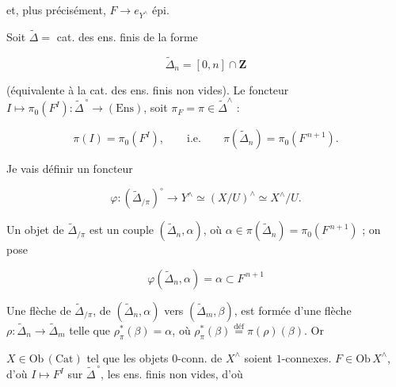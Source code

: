 \documentclass[11pt,a4paper]{article}
\begin{document}
et, plus précisément, $F \to e_{Y^{\wedge}}$ épi.


\struck{\ill{}} Soit $\widetilde{\Delta} = $ cat. des ens. finis de la forme

\[
  \widetilde{\Delta}_{n} = [0,n] \cap \mathbf{Z}
\]

(équivalente à la cat. des ens. finis non vides). Le foncteur
$I \mapsto \pi_{0}(F^{I}) : \widetilde{\Delta}^{\,\circ} \longrightarrow
(\mathrm{Ens})$, soit $\pi_{F} = \pi \in \widetilde{\Delta}^{\wedge}$ :

\[
  \pi(I) = \pi_{0}(F^{I}), \qquad \text{i.e.} \qquad
  \pi(\widetilde{\Delta}_{n}) = \pi_{0}(F^{\,n+1}).
\]

Je vais définir un foncteur

\[
  \varphi : (\widetilde{\Delta}_{/\pi})^{\circ} \longrightarrow Y^{\wedge}
  \simeq (X/U)^{\wedge} \simeq X^{\wedge}/U .
\]

Un objet de $\widetilde{\Delta}_{/\pi}$ est un couple
$(\widetilde{\Delta}_{n}, \alpha)$, où
$\alpha \in \pi(\widetilde{\Delta}_{n}) = \pi_{0}(F^{\,n+1})$ ; on pose

\[
  \varphi(\widetilde{\Delta}_{n}, \alpha) = \alpha \subset F^{\,n+1}
\]



Une flèche de $\widetilde{\Delta}_{/\pi}$, de
$(\widetilde{\Delta}_{n}, \alpha)$ vers $(\widetilde{\Delta}_{m}, \beta)$, est
formée d'une flèche $\rho : \widetilde{\Delta}_{n} \to \widetilde{\Delta}_{m}$
telle que $\rho^{*}_{\pi}(\beta) = \alpha$, où
$\rho^{*}_{\pi}(\beta) \overset{\text{déf}}{=} \pi(\rho)(\beta)$. Or




$X \in \mathrm{Ob}\,(\mathrm{Cat})$ tel que les objets $0$-conn. de
$X^{\wedge}$ soient $1$-connexes. $F \in \mathrm{Ob}\,X^{\wedge}$, d'où
$I \mapsto F^{I}$ sur $\widetilde{\Delta}^{\,\circ}$, les ens. finis non vides,
d'où
\end{document}
